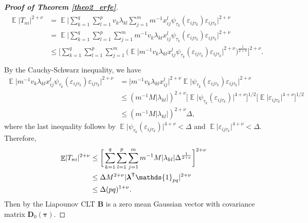 \documentclass[15pt,a4paper]{article}
\DeclareMathOperator{\E}{\mathbb{E}}
\newcommand{\transpose}{{}^{\text{\sffamily T}}}
\begin{document}
\begin{proof}[\textbf{Proof of Theorem \ref{theo2_erfe}}]
\begin{align*}
\begin{split}
 \E\lvert T_{ni} \rvert^{2+\nu} & = \E\bigg\lvert \sum_{k=1}^{q}\sum_{l=1}^{p}v_k\lambda_{kl}\sum_{j=1}^{m}m^{-1}x_{ij}^{l} \psi_{\tau_k}(\varepsilon_{ij\tau_{k}})\varepsilon_{ij\tau_{k}} \bigg\rvert^{2+\nu} \\
& = \E\bigg\lvert \sum_{k=1}^{q}\sum_{l=1}^{p}\sum_{j=1}^{m}m^{-1}v_k\lambda_{kl}x_{ij}^{l} \psi_{\tau_k}(\varepsilon_{ij\tau_{k}})\varepsilon_{ij\tau_{k}} \bigg\rvert^{2+\nu} \\
& \leq \bigg[ \sum_{k=1}^{q}\sum_{l=1}^{p}\sum_{j=1}^{m}\bigg(\E\Big\lvert m^{-1} v_k \lambda_{kl} x_{ij}^{l} \psi_{\tau_k}(\varepsilon_{ij\tau_{k}})\varepsilon_{ij\tau_{k}}\Big\rvert^{2+\nu}\bigg)^{\frac{1}{2+\nu}} \bigg]^{2+\nu}.\\
\end{split}
\end{align*}
By the Cauchy-Schwarz inequality, we have
\begin{equation*}
    \begin{split}
        \E\Big\lvert m^{-1} v_k \lambda_{kl} x_{ij}^{l} \psi_{\tau_k}(\varepsilon_{ij\tau_{k}})\varepsilon_{ij\tau_{k}}\Big\rvert^{2+\nu} 
            &=\lvert m^{-1} v_k\lambda_{kl}x_{ij}^{l}\rvert^{2+\nu}\E\Big\lvert \psi_{\tau_k}(\varepsilon_{ij\tau_{k}})\varepsilon_{ij\tau_{k}}\Big\rvert^{2+\nu} \\
            &\leq (m^{-1}M\lvert\lambda_{kl}\rvert)^{2+\nu} \Big[\E\lvert \psi_{\tau_k}(\varepsilon_{ij\tau_{k}})\rvert^{4+\nu}\Big]^{1/2} 
            \Big[\E\lvert \varepsilon_{ij\tau_{k}}\rvert^{4+\nu}\Big]^{1/2} \\
            & \leq (m^{-1}M\lvert\lambda_{kl}\rvert)^{2+\nu} \Delta,
    \end{split}
\end{equation*}
where the last inequality follows by $\E\lvert \psi_{\tau_k}(\varepsilon_{ij\tau_{k}})\rvert^{4+\nu}<\Delta$ and $\E\lvert \varepsilon_{ij\tau_{k}} \rvert^{4+\nu}<\Delta.$ Therefore,
\begin{align*}
\begin{split}
 \E\lvert T_{ni} \rvert^{2+\nu} & \leq \bigg[ \sum_{k=1}^{q}\sum_{l=1}^{p}\sum_{j=1}^{m} m^{-1} M \lvert\lambda_{kl}\rvert \Delta^{\frac{1}{2+\nu}} \bigg]^{2+\nu}\\
                                & \leq \Delta M^{2+\nu} \lvert\boldsymbol{\lambda}\transpose\mathds{1}_{pq}\rvert^{2+\nu} \\
                                & \leq \Delta (pq)^{1+\nu}. \\
\end{split}
\end{align*}
Then by the Liapounov CLT $\boldsymbol{B}$ is a zero mean Gaussian vector with covariance matrix $\boldsymbol{D}_{0}(\boldsymbol{\tau}).$


\end{proof}
\end{document}
